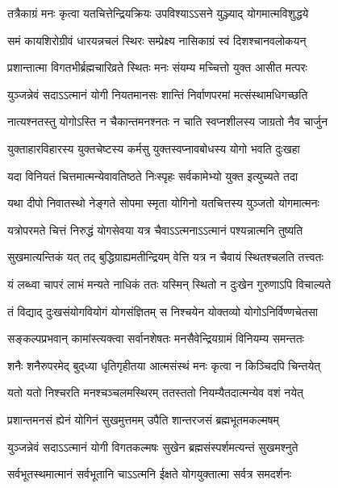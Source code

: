 \twolineshloka
{तत्रैकाग्रं मनः कृत्वा यतचित्तेन्द्रियक्रियः}
{उपविश्याऽऽसने युञ्ज्याद् योगमात्मविशुद्धये}%

\twolineshloka
{समं कायशिरोग्रीवं धारयन्नचलं स्थिरः}
{सम्प्रेक्ष्य नासिकाग्रं स्वं दिशश्चानवलोकयन्}%

\twolineshloka
{प्रशान्तात्मा विगतभीर्ब्रह्मचारिव्रते स्थितः}
{मनः संयम्य मच्चित्तो युक्त आसीत मत्परः}%

\twolineshloka
{युञ्जन्नेवं सदाऽऽत्मानं योगी नियतमानसः}
{शान्तिं निर्वाणपरमां मत्संस्थामधिगच्छति}%

\twolineshloka
{नात्यश्नतस्तु योगोऽस्ति न चैकान्तमनश्नतः}
{न चाति स्वप्नशीलस्य जाग्रतो नैव चार्जुन}%

\twolineshloka
{युक्ताहारविहारस्य युक्तचेष्टस्य कर्मसु}
{युक्तस्वप्नावबोधस्य योगो भवति दुःखहा}%

\twolineshloka
{यदा विनियतं चित्तमात्मन्येवावतिष्ठते}
{निःस्पृहः सर्वकामेभ्यो युक्त इत्युच्यते तदा}%

\twolineshloka
{यथा दीपो निवातस्थो नेङ्गते सोपमा स्मृता}
{योगिनो यतचित्तस्य युञ्जतो योगमात्मनः}%

\twolineshloka
{यत्रोपरमते चित्तं निरुद्धं योगसेवया}
{यत्र चैवाऽऽत्मनाऽऽत्मानं पश्यन्नात्मनि तुष्यति}%

\twolineshloka
{सुखमात्यन्तिकं यत् तद् बुद्धिग्राह्यमतीन्द्रियम्}
{वेत्ति यत्र न चैवायं स्थितश्चलति तत्त्वतः}%

\twolineshloka
{यं लब्ध्वा चापरं लाभं मन्यते नाधिकं ततः}
{यस्मिन् स्थितो न दुःखेन गुरुणाऽपि विचाल्यते}%

\twolineshloka
{तं विद्याद् दुःखसंयोगवियोगं योगसंज्ञितम्}
{स निश्चयेन योक्तव्यो योगोऽनिर्विण्णचेतसा}%

\twolineshloka
{सङ्कल्पप्रभवान् कामांस्त्यक्त्वा सर्वानशेषतः}
{मनसैवेन्द्रियग्रामं विनियम्य समन्ततः}%

\twolineshloka
{शनैः शनैरुपरमेद् बुद्‌ध्या धृतिगृहीतया}
{आत्मसंस्थं मनः कृत्वा न किञ्चिदपि चिन्तयेत्}%

\twolineshloka
{यतो यतो निश्चरति मनश्चञ्चलमस्थिरम्}
{ततस्ततो नियम्यैतदात्मन्येव वशं नयेत्}%

\twolineshloka
{प्रशान्तमनसं ह्येनं योगिनं सुखमुत्तमम्}
{उपैति शान्तरजसं ब्रह्मभूतमकल्मषम्}%

\twolineshloka
{युञ्जन्नेवं सदाऽऽत्मानं योगी विगतकल्मषः}
{सुखेन ब्रह्मसंस्पर्शमत्यन्तं सुखमश्नुते}%

\twolineshloka
{सर्वभूतस्थमात्मानं सर्वभूतानि चाऽऽत्मनि}
{ईक्षते योगयुक्तात्मा सर्वत्र समदर्शनः}%


